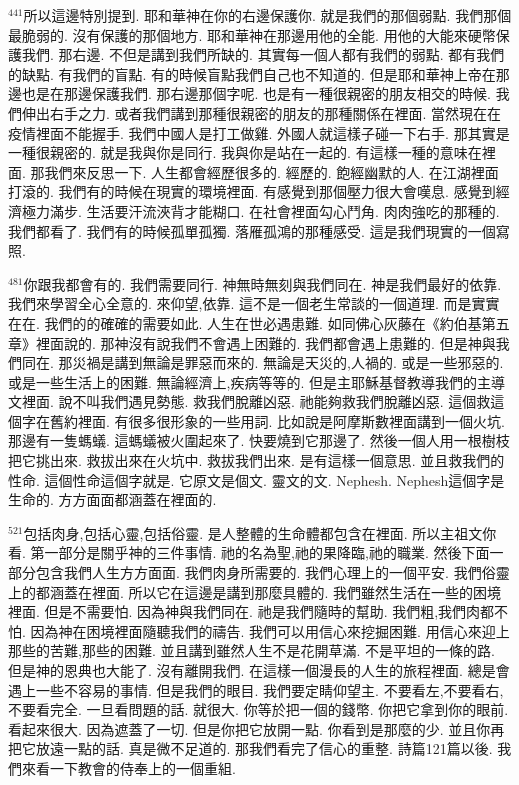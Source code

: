 \documentclass{book}
\begin{document}
$^{441}$所以這邊特別提到.
耶和華神在你的右邊保護你.
就是我們的那個弱點.
我們那個最脆弱的.
沒有保護的那個地方.
耶和華神在那邊用他的全能.
用他的大能來硬幣保護我們.
那右邊.
不但是講到我們所缺的.
其實每一個人都有我們的弱點.
都有我們的缺點.
有我們的盲點.
有的時候盲點我們自己也不知道的.
但是耶和華神上帝在那邊也是在那邊保護我們.
那右邊那個字呢.
也是有一種很親密的朋友相交的時候.
我們伸出右手之力.
或者我們講到那種很親密的朋友的那種關係在裡面.
當然現在在疫情裡面不能握手.
我們中國人是打工做雞.
外國人就這樣子碰一下右手.
那其實是一種很親密的.
就是我與你是同行.
我與你是站在一起的.
有這樣一種的意味在裡面.
那我們來反思一下.
人生都會經歷很多的.
經歷的.
飽經幽默的人.
在江湖裡面打滾的.
我們有的時候在現實的環境裡面.
有感覺到那個壓力很大會嘆息.
感覺到經濟極力滿步.
生活要汗流浹背才能糊口.
在社會裡面勾心鬥角.
肉肉強吃的那種的.
我們都看了.
我們有的時候孤單孤獨.
落雁孤鴻的那種感受.
這是我們現實的一個寫照.

$^{481}$你跟我都會有的.
我們需要同行.
神無時無刻與我們同在.
神是我們最好的依靠.
我們來學習全心全意的.
來仰望,依靠.
這不是一個老生常談的一個道理.
而是實實在在.
我們的的確確的需要如此.
人生在世必遇患難.
如同佛心灰藤在《約伯基第五章》裡面說的.
那神沒有說我們不會遇上困難的.
我們都會遇上患難的.
但是神與我們同在.
那災禍是講到無論是罪惡而來的.
無論是天災的,人禍的.
或是一些邪惡的.
或是一些生活上的困難.
無論經濟上,疾病等等的.
但是主耶穌基督教導我們的主導文裡面.
說不叫我們遇見勢態.
救我們脫離凶惡.
祂能夠救我們脫離凶惡.
這個救這個字在舊約裡面.
有很多很形象的一些用詞.
比如說是阿摩斯數裡面講到一個火坑.
那邊有一隻螞蟻.
這螞蟻被火圍起來了.
快要燒到它那邊了.
然後一個人用一根樹枝把它挑出來.
救拔出來在火坑中.
救拔我們出來.
是有這樣一個意思.
並且救我們的性命.
這個性命這個字就是.
它原文是個文.
靈文的文.
Nephesh.
Nephesh這個字是生命的.
方方面面都涵蓋在裡面的.

$^{521}$包括肉身,包括心靈,包括俗靈.
是人整體的生命體都包含在裡面.
所以主祖文你看.
第一部分是關乎神的三件事情.
祂的名為聖,祂的果降臨,祂的職業.
然後下面一部分包含我們人生方方面面.
我們肉身所需要的.
我們心理上的一個平安.
我們俗靈上的都涵蓋在裡面.
所以它在這邊是講到那麼具體的.
我們雖然生活在一些的困境裡面.
但是不需要怕.
因為神與我們同在.
祂是我們隨時的幫助.
我們粗,我們肉都不怕.
因為神在困境裡面隨聽我們的禱告.
我們可以用信心來挖掘困難.
用信心來迎上那些的苦難,那些的困難.
並且講到雖然人生不是花開草滿.
不是平坦的一條的路.
但是神的恩典也大能了.
沒有離開我們.
在這樣一個漫長的人生的旅程裡面.
總是會遇上一些不容易的事情.
但是我們的眼目.
我們要定睛仰望主.
不要看左,不要看右,不要看完全.
一旦看問題的話.
就很大.
你等於把一個的錢幣.
你把它拿到你的眼前.
看起來很大.
因為遮蓋了一切.
但是你把它放開一點.
你看到是那麼的少.
並且你再把它放遠一點的話.
真是微不足道的.
那我們看完了信心的重整.
詩篇121篇以後.
我們來看一下教會的侍奉上的一個重組.
\end{document}
